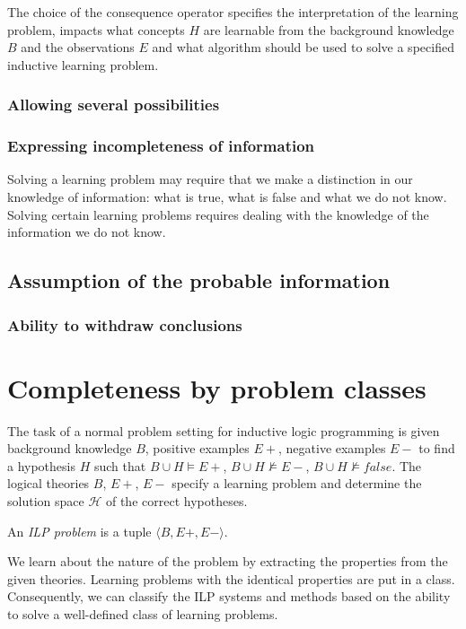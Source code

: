 The choice of the consequence operator specifies the interpretation of the learning problem, impacts what concepts $H$ are learnable from the background knowledge $B$ and the observations $E$ and what algorithm should be used to solve a specified inductive learning problem.

\subsubsection{Allowing several possibilities}


\subsubsection{Expressing incompleteness of information}
Solving a learning problem may require that we make a distinction in our knowledge of information: what is true, what is false and what we do not know.
Solving certain learning problems requires dealing with the knowledge of the information we do not know.

\subsection{Assumption of the probable information}

\subsubsection{Ability to withdraw conclusions}


\section{Completeness by problem classes}
The task of a normal problem setting for inductive logic programming is given background knowledge $B$, positive examples $E+$, negative examples $E-$ to find a hypothesis $H$ such that $B \cup H \models E+$,
$B \cup H \not\models E-$,
$B \cup H \not\models false$.
The logical theories $B$, $E+$, $E-$ specify a learning problem and determine the solution space $\mathcal{H}$ of the correct hypotheses.

\begin{defn}
An \emph{ILP problem} is a tuple $\langle B, E+, E- \rangle$.
\end{defn}

We learn about the nature of the problem by extracting the properties from the given theories. Learning problems with the identical properties are put in a class. Consequently, we can classify the ILP systems and methods based on the ability to solve a well-defined class of learning problems.

